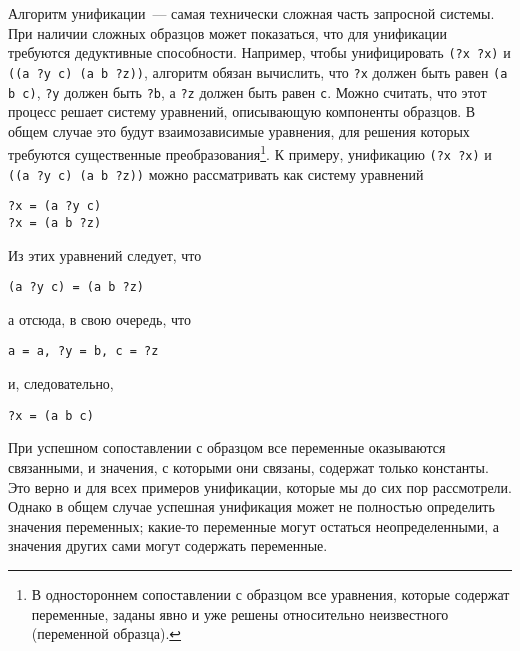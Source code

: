 Алгоритм унификации~--- самая технически сложная часть
запросной системы.  При наличии сложных образцов может показаться, что
для унификации требуются дедуктивные способности.  Например, чтобы
унифицировать {\tt (?x ?x)} и {\tt ((a ?y c) (a b ?z))},
алгоритм обязан вычислить, что {\tt ?x} должен быть равен
{\tt (a b c)}, {\tt ?y} должен быть {\tt ?b}, а
{\tt ?z} должен быть равен {\tt c}. Можно считать, что
этот процесс решает систему уравнений, описывающую компоненты
образцов.  В общем случае это будут взаимозависимые уравнения, для
решения которых требуются существенные преобразования\footnote{В 
одностороннем сопоставлении с образцом все
уравнения, которые содержат переменные, заданы явно и уже решены
относительно неизвестного (переменной образца).}.
К примеру,
унификацию {\tt (?x ?x)} и {\tt ((a ?y c) (a b ?z))}
можно рассматривать как систему уравнений

\begin{Verbatim}[fontsize=\small]
?x = (a ?y c)
?x = (a b ?z)
\end{Verbatim}
Из этих уравнений следует, что

\begin{Verbatim}[fontsize=\small]
(a ?y c) = (a b ?z)
\end{Verbatim}
а отсюда, в свою очередь, что

\begin{Verbatim}[fontsize=\small]
a = a, ?y = b, c = ?z
\end{Verbatim}
и, следовательно,

\begin{Verbatim}[fontsize=\small]
?x = (a b c)
\end{Verbatim}

При 
успешном сопоставлении с образцом все переменные 
оказываются связанными, и значения, с которыми они связаны, содержат
только константы.  Это верно и для всех примеров унификации, которые
мы до сих пор рассмотрели.  Однако в общем случае успешная унификация
может не полностью определить значения переменных; какие-то переменные
могут остаться неопределенными, а значения других сами могут содержать
переменные.

